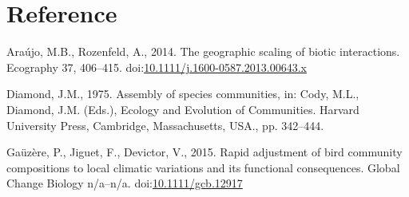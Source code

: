 \newpage

\section*{Reference}\label{reference}

\hypertarget{refs}{}
\hypertarget{ref-Araujo2014}{}
Araújo, M.B., Rozenfeld, A., 2014. The geographic scaling of biotic
interactions. Ecography 37, 406--415.
doi:\href{https://doi.org/10.1111/j.1600-0587.2013.00643.x}{10.1111/j.1600-0587.2013.00643.x}

\hypertarget{ref-Diamond1975}{}
Diamond, J.M., 1975. Assembly of species communities, in: Cody, M.L.,
Diamond, J.M. (Eds.), Ecology and Evolution of Communities. Harvard
University Press, Cambridge, Massachusetts, USA., pp. 342--444.

\hypertarget{ref-Gauzere2015}{}
Gaüzère, P., Jiguet, F., Devictor, V., 2015. Rapid adjustment of bird
community compositions to local climatic variations and its functional
consequences. Global Change Biology n/a--n/a.
doi:\href{https://doi.org/10.1111/gcb.12917}{10.1111/gcb.12917}

